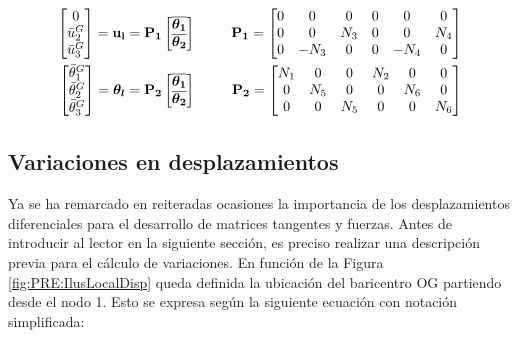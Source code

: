  \begin{eqnarray}
 	\label{Eqn:PRE:CompactTransveralDisp}
		\begin{bmatrix}
			0     \\
		\bar{u}_2^G \\
		\bar{u}_3^G
	\end{bmatrix}=\bf{u_l}=\bf{P}_1
	\begin{bmatrix}
		\boldsymbol{\overline{\bf{\theta_1}}}\\
		\boldsymbol{\overline{\bf{\theta_2}}}
	\end{bmatrix} &~~~~~ &
	\bf{P}_1 = \begin{bmatrix}
		 0 &   0  & 0 & 0  & 0 & 0 \\
		 0  &  0 & N_3 & 0 & 0 & N_4 \\
		 0  &  -N_3  & 0 & 0 & -N_4 & 0
	\end{bmatrix} \\
	\label{Eqn:PRE:CompactTransversalAngs}
		\begin{bmatrix}
			\bar{\theta}_1^G\\
			\bar{\theta}_2^G \\
			\bar{\theta}_3^G
		\end{bmatrix}=\boldsymbol{\theta_l}=\bf{P}_2
		\begin{bmatrix}
			\boldsymbol{\overline{\bf{\theta_1}}}\\
			\boldsymbol{\overline{\bf{\theta_2}}}
		\end{bmatrix}& ~~~~~ &\bf{P}_2=
	\begin{bmatrix}
	N_1 & 0 & 0 & N_2 & 0 & 0 \\
	0  & N_5 & 0 & 0 &N_6 &0 \\
	0  &  0  & N_5 & 0 & 0 &N_6
	\end{bmatrix}
 \end{eqnarray}


\subsection{Variaciones en desplazamientos} \label{Sec:PRE:VariacionesDesplazamientos}
Ya se ha remarcado en reiteradas ocasiones la importancia de los desplazamientos diferenciales para el desarrollo de matrices tangentes y fuerzas. Antes de introducir al lector en la siguiente sección, es preciso realizar una descripción previa para el cálculo de variaciones. En función de la Figura \ref{fig:PRE:IlusLocalDisp} queda definida la ubicación del baricentro OG partiendo desde el nodo 1. Esto se expresa según la siguiente ecuación con notación simplificada:

